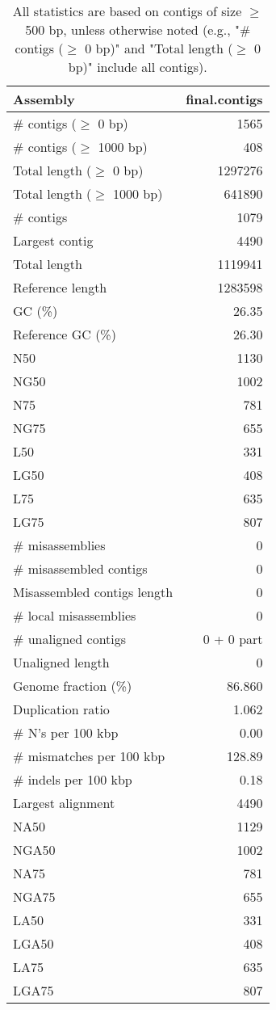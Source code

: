 \documentclass[12pt,a4paper]{article}
\begin{document}
\begin{table}[ht]
\begin{center}
\caption{All statistics are based on contigs of size $\geq$ 500 bp, unless otherwise noted (e.g., "\# contigs ($\geq$ 0 bp)" and "Total length ($\geq$ 0 bp)" include all contigs).}
\begin{tabular}{|l*{1}{|r}|}
\hline
Assembly & final.contigs \\ \hline
\# contigs ($\geq$ 0 bp) & 1565 \\ \hline
\# contigs ($\geq$ 1000 bp) & 408 \\ \hline
Total length ($\geq$ 0 bp) & 1297276 \\ \hline
Total length ($\geq$ 1000 bp) & 641890 \\ \hline
\# contigs & 1079 \\ \hline
Largest contig & 4490 \\ \hline
Total length & 1119941 \\ \hline
Reference length & 1283598 \\ \hline
GC (\%) & 26.35 \\ \hline
Reference GC (\%) & 26.30 \\ \hline
N50 & 1130 \\ \hline
NG50 & 1002 \\ \hline
N75 & 781 \\ \hline
NG75 & 655 \\ \hline
L50 & 331 \\ \hline
LG50 & 408 \\ \hline
L75 & 635 \\ \hline
LG75 & 807 \\ \hline
\# misassemblies & 0 \\ \hline
\# misassembled contigs & 0 \\ \hline
Misassembled contigs length & 0 \\ \hline
\# local misassemblies & 0 \\ \hline
\# unaligned contigs & 0 + 0 part \\ \hline
Unaligned length & 0 \\ \hline
Genome fraction (\%) & 86.860 \\ \hline
Duplication ratio & 1.062 \\ \hline
\# N's per 100 kbp & 0.00 \\ \hline
\# mismatches per 100 kbp & 128.89 \\ \hline
\# indels per 100 kbp & 0.18 \\ \hline
Largest alignment & 4490 \\ \hline
NA50 & 1129 \\ \hline
NGA50 & 1002 \\ \hline
NA75 & 781 \\ \hline
NGA75 & 655 \\ \hline
LA50 & 331 \\ \hline
LGA50 & 408 \\ \hline
LA75 & 635 \\ \hline
LGA75 & 807 \\ \hline
\end{tabular}
\end{center}
\end{table}
\end{document}
